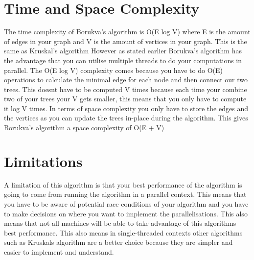 \documentclass{report}
\begin{document}
\section{Time and Space Complexity}
The time complexity of Borukva's algorithm is O(E log V) where E is the amount of edges in your graph and V is the amount of vertices in your graph. This is the same as Kruskal's algorithm However as stated earlier Borukva's algorithm has the advantage that you can utilise multiple threads to do your computations in parallel.
The O(E log V) complexity comes because you have to do O(E) operations to calculate the minimal edge for each node and then connect our two trees. This doesnt have to be computed V times because each time your combine two of your trees your V gets smaller, this means that you only have to compute it log V times.
In terms of space complexity you only have to store the edges and the vertices as you can update the trees in-place during the algorithm. This gives Borukva's algorithm a space complexity of O(E + V)

\section{Limitations}
A limitation of this algorithm is that your best performance of the algorithm is going to come from running the algorithm in a parallel context. This means that you have to be aware of potential race conditions of your algorithm and you have to make decisions on where you want to implement the parallelisations. This also means that not all machines will be able to take advantage of this algorithms best performance. This also means in single-threaded contexts other algorithms such as Kruskals algorithm are a better choice because they are simpler and easier to implement and understand.
\end{document}
